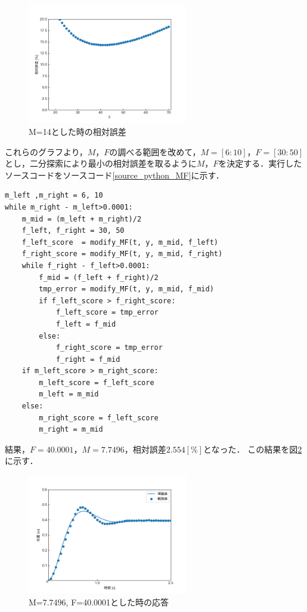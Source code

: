 \documentclass[12pt]{jsarticle}
\begin{document}
\begin{figure}[H]
  \begin{center}
    \includegraphics[clip,width=7.0cm]{../img/M-14.png}
    \caption{M=14とした時の相対誤差}
    \label{Figure-M=14}
  \end{center}
\end{figure}
これらのグラフより，$M$，$F$の調べる範囲を改めて，$M=[6:10]$，$F=[30:50]$とし，二分探索により最小の相対誤差を取るように$M$，$F$を決定する．実行したソースコードをソースコード\ref{source_python_MF}に示す．
\newpage
\begin{lstlisting}[caption = python code, label = source_python_MF]
m_left ,m_right = 6, 10
while m_right - m_left>0.0001:
    m_mid = (m_left + m_right)/2
    f_left, f_right = 30, 50
    f_left_score  = modify_MF(t, y, m_mid, f_left)
    f_right_score = modify_MF(t, y, m_mid, f_right)
    while f_right - f_left>0.0001:
        f_mid = (f_left + f_right)/2
        tmp_error = modify_MF(t, y, m_mid, f_mid)
        if f_left_score > f_right_score:
            f_left_score = tmp_error
            f_left = f_mid
        else:
            f_right_score = tmp_error
            f_right = f_mid
    if m_left_score > m_right_score:
        m_left_score = f_left_score
        m_left = m_mid
    else:
        m_right_score = f_left_score
        m_right = m_mid
\end{lstlisting}
結果，$F=40.0001$，$M=7.7496$，相対誤差$2.554[\%]$となった．
この結果を図\ref{Figure-modify_MF_doutei}に示す．
\begin{figure}[tb]
  \begin{center}
    \includegraphics[clip,width=7.0cm]{../img/modify_MF_doute.png}
    \caption{M=7.7496, F=40.0001とした時の応答}
    \label{Figure-modify_MF_doutei}
  \end{center}
\end{figure}
\end{document}
